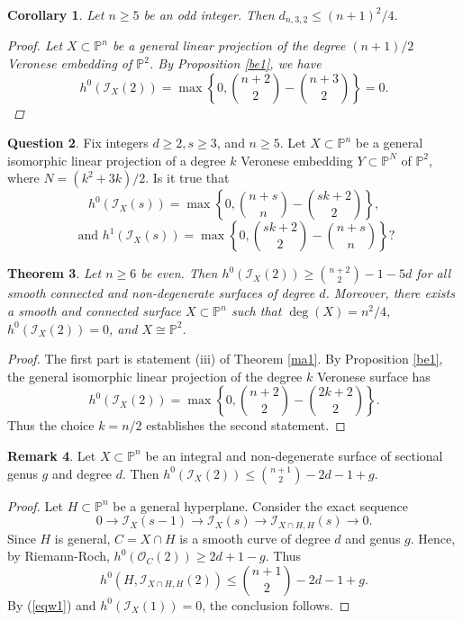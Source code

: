 \documentclass[a4, 11pt]{amsart}
\theoremstyle{plain}
\newtheorem{theorem}{Theorem}[section]
\newtheorem{corollary}[theorem]{Corollary}
\theoremstyle{definition}
\newtheorem{remark}[theorem]{Remark}
\newtheorem{question}[theorem]{Question}
\newcommand{\enm}[1]{\ensuremath{#1}}          %
\newcommand{\cal}[1]{\mathcal{#1}}
\newcommand{\PP}{\enm{\mathbb{P}}}
\newcommand{\Ii}{\enm{\cal{I}}}
\newcommand{\Oo}{\enm{\cal{O}}}
\begin{document}
\begin{corollary}\label{be3}
Let $n\ge 5$ be an odd integer. Then $d_{n,3,2} \le (n+1)^2/4$.
\begin{proof}
Let $X\subset \PP^n$ be a general linear projection of the degree $(n+1)/2$ Veronese embedding of $\PP^2$. By Proposition
\ref{be1}, we have
\[
h^0(\Ii _X(2)) =\max \left\{0,\binom{n+2}{2} -\binom{n+3}{2}\right\}=0.
\]
\end{proof}
\end{corollary}


\begin{question}
Fix integers $d \ge 2, s\ge 3$, and $n\ge 5$. Let $X\subset \PP^n$ be a general isomorphic linear projection of
a degree $k$ Veronese embedding $Y\subset \PP^N$ of $\PP^2$, where $N= (k^2+3k)/2$. Is it true that
\[
h^0(\Ii _X(s)) = \max \left\{0,\binom{n+s}{n} -\binom{sk+2}{2}\right\},
\]
\[
\mbox{ and } h^1(\Ii _X(s)) =  \max \left\{0,\binom{sk+2}{2}-\binom{n+s}{n} \right\}?
\]

\end{question}


\begin{theorem}\label{be2}
Let $n\ge 6$ be even. Then $h^0(\Ii _X(2)) \ge \binom{n+2}{2} - 1 - 5d$ for all smooth connected and non-degenerate surfaces of degree $d$. 
Moreover, there exists a smooth and connected surface $X\subset \PP^n$ such that $\deg (X) =n^2/4$, $h^0(\Ii _X(2)) =0$, and $X\cong \PP^2$. 
\end{theorem}
\begin{proof}
The first part is statement (iii) of Theorem \ref{ma1}. By Proposition \ref{be1}, the general isomorphic linear projection of the degree $k$ Veronese surface has 
\[
h^0(\Ii _X(2)) =\max \left\{0,\binom{n+2}{2} -\binom{2k+2}{2}\right\}.
\] 
Thus the choice $k = n/2$ establishes the second statement. 
\end{proof}

\begin{remark}\label{w2}
Let $X\subset \PP^n$ be an integral and non-degenerate surface of sectional genus $g$ and degree $d$. Then $h^0(\Ii _{X}(2)) \le \binom{n+1}{2} - 2d-1+g$.
\begin{proof}
Let $H\subset \PP^n$ be a general hyperplane. Consider the exact sequence
\begin{equation}\label{eqw1}
0 \longrightarrow \Ii _X(s-1)\longrightarrow \Ii _X(s)\longrightarrow \Ii _{X\cap H,H}(s)\longrightarrow 0.
\end{equation}
Since $H$ is general, $C = X\cap H$ is a smooth curve of degree $d$ and genus $g$. Hence, by Riemann-Roch, $h^0(\Oo_C(2)) \geq 2d+1-g$. 
Thus 
\[
h^0(H,\Ii _{X\cap H,H}(2)) \le \binom{n+1}{2} - 2d-1+g.
\] 
By (\ref{eqw1}) and $h^0(\Ii _X(1)) =0$, the conclusion follows.
\end{proof}
\end{remark}
\end{document}
